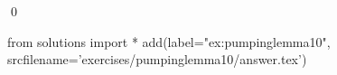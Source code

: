 
\begin{ex} 
  \label{ex:pumpinglemma10}
  
  \qed
\end{ex} 
\begin{python0}
from solutions import *
add(label="ex:pumpinglemma10",
    srcfilename='exercises/pumpinglemma10/answer.tex') 
\end{python0}
